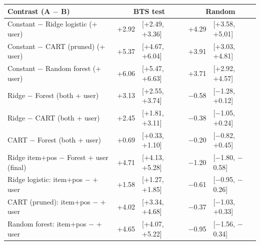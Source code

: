 \begin{tabular}{@{}lrlrl@{}}\toprule
Contrast (A \(-\) B) & \multicolumn{2}{c}{\color{bts}\textbf{BTS test}} & \multicolumn{2}{c}{\color{rnd}\textbf{Random}}\\\midrule
Constant \(-\) Ridge logistic (+ user) & +2.92 & [+2.49, +3.36] & +4.29 & [+3.58, +5.01] \\
Constant \(-\) CART (pruned) (+ user) & +5.37 & [+4.67, +6.04] & +3.91 & [+3.03, +4.81] \\
Constant \(-\) Random forest (+ user) & +6.06 & [+5.47, +6.63] & +3.71 & [+2.92, +4.57] \\
\midrule
Ridge \(-\) Forest (both + user) & +3.13 & [+2.55, +3.74] & \(-\)0.58 & [\(-\)1.28, +0.12] \\
Ridge \(-\) CART (both + user) & +2.45 & [+1.81, +3.11] & \(-\)0.38 & [\(-\)1.05, +0.24] \\
CART \(-\) Forest (both + user) & +0.69 & [+0.33, +1.10] & \(-\)0.20 & [\(-\)0.82, +0.45] \\
Ridge item+pos \(-\) Forest + user (final) & +4.71 & [+4.13, +5.28] & \(-\)1.20 & [\(-\)1.80, \(-\)0.58] \\
\midrule
Ridge logistic: item+pos \(-\) + user & +1.58 & [+1.27, +1.85] & \(-\)0.61 & [\(-\)0.95, \(-\)0.26] \\
CART (pruned): item+pos \(-\) + user & +4.02 & [+3.34, +4.68] & \(-\)0.37 & [\(-\)1.03, +0.33] \\
Random forest: item+pos \(-\) + user & +4.65 & [+4.07, +5.22] & \(-\)0.95 & [\(-\)1.56, \(-\)0.34] \\
\bottomrule\end{tabular}